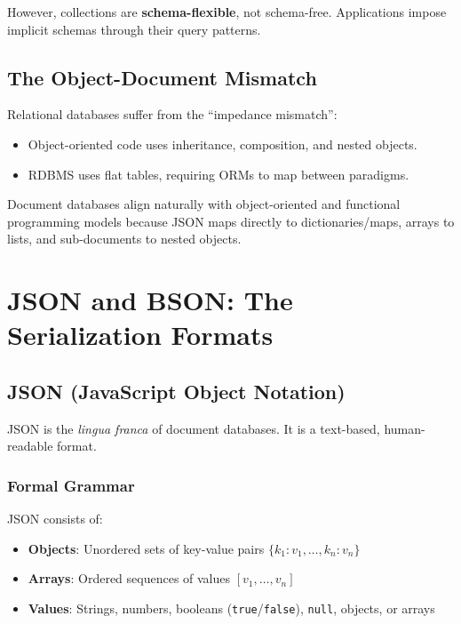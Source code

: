 \documentclass[12pt,a4paper]{article}
\begin{document}
However, collections are \textbf{schema-flexible}, not schema-free. Applications impose implicit schemas through their query patterns.

\subsection{The Object-Document Mismatch}

Relational databases suffer from the ``impedance mismatch'':
\begin{itemize}[noitemsep]
    \item Object-oriented code uses inheritance, composition, and nested objects.
    \item RDBMS uses flat tables, requiring ORMs to map between paradigms.
\end{itemize}

Document databases align naturally with object-oriented and functional programming models because JSON maps directly to dictionaries/maps, arrays to lists, and sub-documents to nested objects.

\section{JSON and BSON: The Serialization Formats}

\subsection{JSON (JavaScript Object Notation)}

JSON is the \textit{lingua franca} of document databases. It is a text-based, human-readable format.

\subsubsection{Formal Grammar}

JSON consists of:
\begin{itemize}[noitemsep]
    \item \textbf{Objects}: Unordered sets of key-value pairs $\{k_1: v_1, \dots, k_n: v_n\}$
    \item \textbf{Arrays}: Ordered sequences of values $[v_1, \dots, v_n]$
    \item \textbf{Values}: Strings, numbers, booleans (\texttt{true}/\texttt{false}), \texttt{null}, objects, or arrays
\end{itemize}
\end{document}
